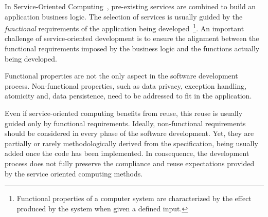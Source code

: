 




In Service-Oriented Computing~\cite{Papazoglou2007}, pre-ex\-isting services are
combined to build an application business logic.
The selection of services is usually guided by the \textit{functional} requirements of the application being developed~\cite{2,decastro1,PapazoglouH06}\footnote{Functional properties of a computer system are characterized by the effect produced by the system when given a defined input.}.
An important challenge of service-o\-rien\-ted development is  to ensure the alignment between the functional requirements imposed by the business logic and the functions actually being developed.

Functional properties are not the only  aspect in the software development process.
Non-functional properties, such as data privacy, exception handling, atomicity  and, data persistence, need to be addressed  to fit in the application.

Even if service-oriented computing benefits from reuse, this reuse is usually guided only by functional requirements.
%
Ideally, non-functional requirements should be considered in every phase of the software development.
Yet,  they are partially or rarely methodologically derived from the specification, being usually added once the code has been im\-ple\-men\-ted. 
In consequence, the development process does not fully preserve the compliance and re\-use expectations provided by the service oriented computing methods.


